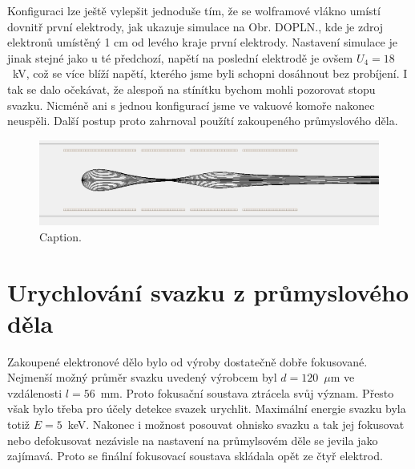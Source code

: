 Konfiguraci lze ještě vylepšit jednoduše tím, že se wolframové vlákno umístí dovnitř první elektrody, jak ukazuje simulace na Obr. DOPLN., kde je zdroj elektronů umístěný 1 cm od levého kraje první elektrody. Nastavení simulace je jinak stejné jako u té předchozí, napětí na poslední elektrodě je ovšem $U_4 = 18$~kV, což se více blíží napětí, kterého jsme byli schopni dosáhnout bez probíjení. I tak se dalo očekávat, že alespoň na stínítku bychom mohli pozorovat stopu svazku. Nicméně ani s jednou konfigurací jsme ve vakuové komoře nakonec neuspěli. Další postup proto zahrnoval použítí zakoupeného průmyslového děla.\\

\begin{figure}[htbp!]
\centering
\includegraphics[width = 366 pt]{Figure/05/2c.jpg}
\caption{Caption.}
\label{05simulaceVlastniDeloWehnelt}
\end{figure}

\section{Urychlování svazku z průmyslového děla}

Zakoupené elektronové dělo bylo od výroby dostatečně dobře fokusované. Nejmenší možný průměr svazku uvedený výrobcem byl $d = 120$~$\mu$m ve vzdálenosti $l = 56$~mm. Proto fokusační soustava ztrácela svůj význam. Přesto však bylo třeba pro účely detekce svazek urychlit. Maximální energie svazku byla totiž $E = 5$~keV. Nakonec i možnost posouvat ohnisko svazku a tak jej fokusovat nebo defokusovat nezávisle na nastavení na průmylsovém děle se jevila jako zajímavá. Proto se finální fokusovací soustava skládala opět ze čtyř elektrod.\\

